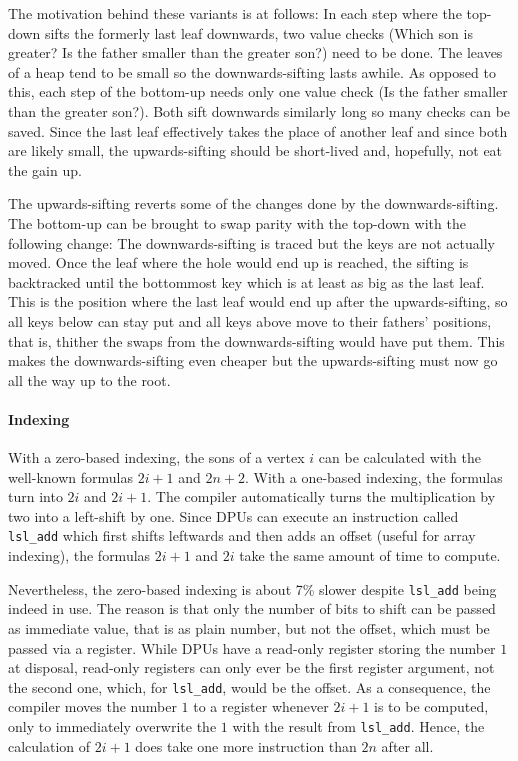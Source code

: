 The motivation behind these variants is at follows:
In each step where the top-down \HS{} sifts the formerly last leaf downwards, two value checks (Which son is greater? Is the father smaller than the greater son?) need to be done.
The leaves of a heap tend to be small so the downwards-sifting lasts awhile.
As opposed to this, each step of the bottom-up \HS{} needs only one value check (Is the father smaller than the greater son?).
Both \HS*{} sift downwards similarly long so many checks can be saved.
Since the last leaf effectively takes the place of another leaf and since both are likely small, the upwards-sifting should be short-lived and, hopefully, not eat the gain up.

The upwards-sifting reverts some of the changes done by the downwards-sifting.
The bottom-up \HS{} can be brought to swap parity with the top-down \HS{} with the following change:
The downwards-sifting is traced but the keys are not actually moved.
Once the leaf where the hole would end up is reached, the sifting is backtracked until the bottommost key which is at least as big as the last leaf.
This is the position where the last leaf would end up after the upwards-sifting, so all keys below can stay put and all keys above move to their fathers' positions, that is, thither the swaps from the downwards-sifting would have put them.
This makes the downwards-sifting even cheaper but the upwards-sifting must now go all the way up to the root.

\paragraph{Indexing}
With a zero-based indexing, the sons of a vertex \(i\) can be calculated with the well-known formulas \(2i + 1\) and \(2n + 2\).
With a one-based indexing, the formulas turn into \(2i\) and \(2i + 1\).
The compiler automatically turns the multiplication by two into a left-shift by one.
Since DPUs can execute an instruction called \lstinline|lsl_add| which first shifts leftwards and then adds an offset (useful \eg{} for array indexing), the formulas \(2i + 1\) and \(2i\) take the same amount of time to compute.

Nevertheless, the zero-based indexing is about 7\% slower despite \lstinline|lsl_add| being indeed in use.
The reason is that only the number of bits to shift can be passed as immediate value, that is as plain number, but not the offset, which must be passed via a register.
While DPUs have a read-only register storing the number \(1\) at disposal, read-only registers can only ever be the first register argument, not the second one, which, for \lstinline|lsl_add|, would be the offset.
As a consequence, the compiler moves the number \(1\) to a register whenever \(2i + 1\) is to be computed, only to immediately overwrite the \(1\) with the result from \lstinline|lsl_add|.
Hence, the calculation of \(2i + 1\) does take one more instruction than \(2n\) after all.

